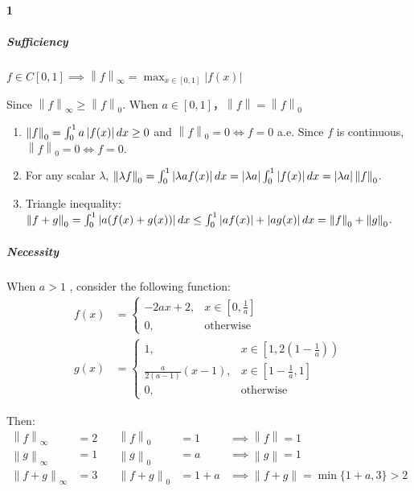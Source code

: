 \documentclass{../../../articles/mathnotes-art}
\begin{document}

\paragraph{1}
\subparagraph{Sufficiency}
\(f \in C[0,1] \implies \left\| f \right\|_{\infty } = \max_{x \in
[0,1]} |f(x)|\)

Since \(\left\| f \right\|_{\infty} \geq \left\| f \right\|_{0}\). When
\(a \in [0,1]\)，\(\left\| f \right\| = \left\| f \right\|_{0}\)

\begin{enumerate}
    \item \(\left\| f \right\|_{0} = \int_{0}^{1} a\left|f(x)\right| dx
        \geq 0\) and \(\left\| f \right\|_{0} = 0 \iff f = 0\) a.e.
        Since \(f\) is continuous, \(\left\| f \right\|_{0} = 0 \iff f = 0\).
    \item For any scalar \(\lambda\), \(\left\| \lambda f \right\|_{0} =
            \int_{0}^{1} \left|\lambda a f(x)\right| dx = \left|\lambda a\right|
            \int_{0}^{1} \left|f(x)\right| dx = \left|\lambda a\right| \left\| f
        \right\|_{0}\).
    \item Triangle inequality: \(\left\| f + g \right\|_{0} =
            \int_{0}^{1} \left|a(f(x) + g(x))\right| dx \leq
            \int_{0}^{1} \left|af(x)\right| + \left|ag(x)\right| dx = \left\| f
        \right\|_{0} + \left\| g \right\|_{0}\).

\end{enumerate}

\subparagraph{Necessity}

When \(a > 1\) , consider the following function:
\begin{align*}
    f(x) &=
    \begin{cases}
        -2ax + 2, & x \in \left[ 0, \frac{1}{a} \right] \\
        0, & \text{otherwise}
    \end{cases} \\
    g(x) &=
    \begin{cases}
        1, & x \in \left[1, 2\left( 1-\frac{1}{a} \right)\right) \\
        \frac{a}{2(a-1)}(x-1), & x \in \left[ 1-\frac{1}{a}, 1 \right] \\
        0, & \text{otherwise}
    \end{cases}
\end{align*}

Then:
\begin{align*}
    \left\| f \right\|_{\infty} &= 2 &\quad \left\| f \right\|_{0} &= 1
    &\implies \left\| f \right\| = 1\\
    \left\| g \right\|_{\infty} &= 1 &\quad \left\| g \right\|_{0} &= a
    &\implies \left\| g \right\| = 1\\
    \left\| f + g \right\|_{\infty} &= 3 &\quad \left\| f + g
    \right\|_{0} &= 1+a &\implies \left\| f + g \right\| = \min \{1+a,3\} > 2
\end{align*}
\end{document}
